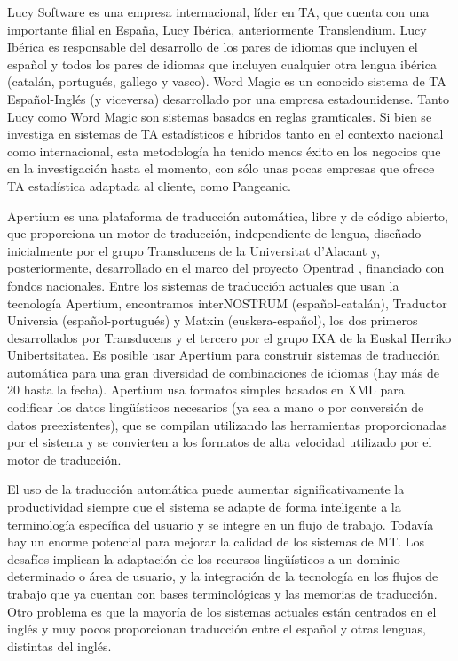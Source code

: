 \begin{multicols}{2}
Lucy Software es una empresa internacional, líder en TA, que cuenta con una importante filial en España, Lucy Ibérica, anteriormente Translendium. Lucy Ibérica es responsable del desarrollo de los pares de idiomas que incluyen el español y todos los pares de idiomas que incluyen cualquier otra lengua ibérica (catalán, portugués, gallego y vasco). Word Magic es un conocido sistema de TA Español-Inglés (y viceversa) desarrollado por una empresa estadounidense. Tanto Lucy como Word Magic son sistemas basados en reglas gramticales. Si bien se investiga en sistemas de TA estadísticos e híbridos tanto en el contexto nacional como internacional, esta metodología ha tenido menos éxito en los negocios que en la investigación hasta el momento, con sólo unas pocas empresas que ofrece TA estadística adaptada al cliente, como Pangeanic.

Apertium es una plataforma de traducción automática, libre y de código abierto, que proporciona un motor de traducción, independiente de lengua, diseñado inicialmente por el grupo Transducens de la Universitat d'Alacant y, posteriormente, desarrollado en el marco del proyecto Opentrad , financiado con fondos nacionales. Entre los sistemas de traducción actuales que usan la tecnología Apertium, encontramos interNOSTRUM (español-catalán), Traductor Universia (español-portugués) y Matxin (euskera-español), los dos primeros desarrollados por Transducens y el tercero por el grupo IXA de la Euskal Herriko Unibertsitatea. Es posible usar Apertium para construir sistemas de traducción automática para una gran diversidad de combinaciones de idiomas (hay más de 20 hasta la fecha). Apertium usa formatos simples basados en XML para codificar los datos lingüísticos necesarios (ya sea a mano o por conversión de datos preexistentes), que se compilan utilizando las herramientas proporcionadas por el sistema y se convierten a los formatos de alta velocidad utilizado por el motor de traducción.

El uso de la traducción automática puede aumentar significativamente la productividad siempre que el sistema se adapte de forma inteligente a la terminología específica del usuario y se integre en un flujo de trabajo.
Todavía hay un enorme potencial para mejorar la calidad de los sistemas de MT. Los desafíos implican la adaptación de los recursos lingüísticos a un dominio determinado o área de usuario, y la integración de la tecnología en los flujos de trabajo que ya cuentan con bases terminológicas y las memorias de traducción. Otro problema es que la mayoría de los sistemas actuales están centrados en el inglés y  muy pocos proporcionan traducción entre el español y otras lenguas, distintas del inglés. 


\end{multicols}
